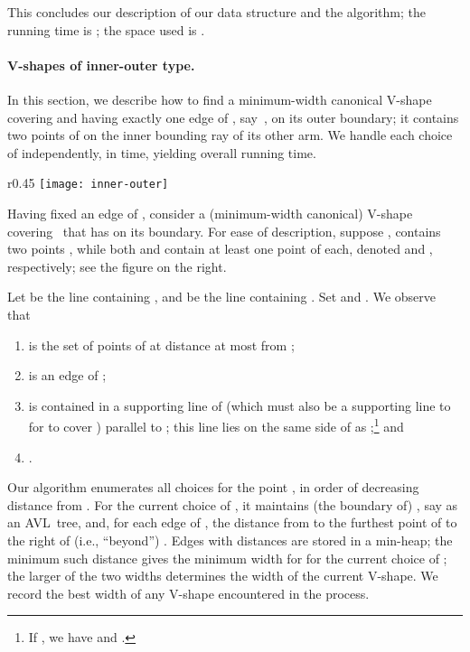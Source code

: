 \documentclass{llncs}
\begin{document}
This concludes our description of our data structure and the
algorithm; the running time is ; the space used is
.
\fi

\paragraph{V-shapes of inner-outer type.}




In this section, we describe how to find a minimum-width canonical
V-shape covering  and having exactly one edge of , say~,
on its outer boundary; it
contains two points of  on the inner bounding ray of its other arm.
We handle each choice of  independently, in  time,
yielding overall  running time.

\begin{wrapfigure}[15]{r}{0.45\textwidth}
 \texttt{[image: inner-outer]}
\end{wrapfigure}

Having fixed an edge  of , consider a (minimum-width
canonical) V-shape~ covering~ that has  on its boundary. For
ease of description, suppose ,  contains two
points , while both  and  contain at least one point
of  each, denoted  and , respectively; see the figure on the right.


Let  be the line containing , and  be the line
containing .  Set  and .  We
observe that
\begin{enumerate} \itemsep 0pt \parsep 0pt \parskip 0pt
\item  is the set of points of  at distance at most
   from ;
\item  is an edge of ;
\item  is contained in a supporting line  of
   (which must also be a supporting line to  for 
   to cover ) parallel to ; this line lies on
  the same side of  as ;\footnote{If , we have  and .}
   and
\item .
\end{enumerate}
Our algorithm enumerates all choices for the point , in order of
decreasing distance from . 
  For the current choice of , it
maintains (the boundary of)
, say as an AVL~tree, and, for each edge  of
, 
the distance from  to the furthest point of  to the
right of (i.e., ``beyond'') .
Edges with distances are
stored in a min-heap; the minimum such distance gives the minimum
width for  for the current choice of ; the larger of the two widths
determines the width of the current V-shape.  We record the best width
of any V-shape encountered in the process.
\end{document}

